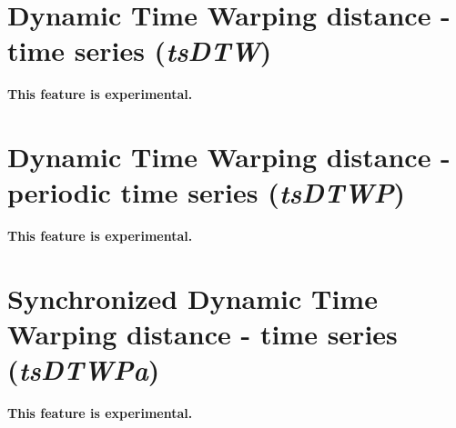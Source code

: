 \section{Dynamic Time Warping distance - time series ({\it tsDTW})}
\textbf{This feature is experimental.}

\section{Dynamic Time Warping distance - periodic time series ({\it tsDTWP})}
\textbf{This feature is experimental.}

\section{Synchronized Dynamic Time Warping distance - time series ({\it tsDTWPa})}
\textbf{This feature is experimental.}

\newpage